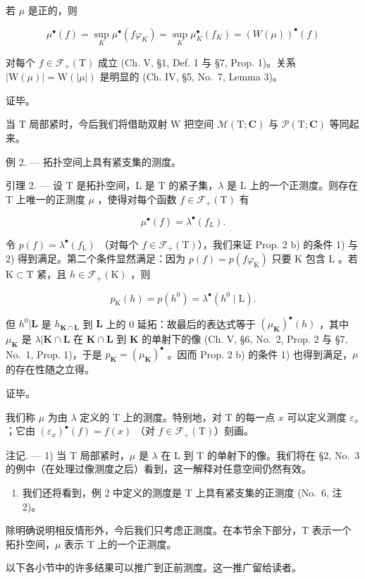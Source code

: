 若 \(\mu\) 是正的，则

\[
\mu^ {\bullet} (f) = \sup _ {K} \mu^ {\bullet} (f \varphi_ {K}) = \sup _ {K} \mu_ {K} ^ {\bullet} (f _ {K}) = (W (\mu)) ^ {\bullet} (f)
\]

对每个 \(f \in \mathcal{F}_{+}(\mathrm{T})\) 成立 (Ch. V, §1, Def. 1 与 §7, Prop. 1)。关系 \(|\mathrm{W}(\mu)| = \mathrm{W}(|\mu|)\) 是明显的 (Ch. IV, §5, No.~7, Lemma 3)。

证毕。

当 T 局部紧时，今后我们将借助双射 W 把空间 \(\mathcal{M}(\mathrm{T};\mathbf{C})\) 与 \(\mathcal{P}(\mathrm{T};\mathbf{C})\) 等同起来。

例 2. --- 拓扑空间上具有紧支集的测度。

引理 2. --- 设 T 是拓扑空间，L 是 T 的紧子集，\(\lambda\) 是 L 上的一个正测度。则存在 T 上唯一的正测度 \(\mu\) ，使得对每个函数 \(f \in \mathcal{F}_{+}(\mathrm{T})\) 有

\[
\mu^ {\bullet} (f) = \lambda^ {\bullet} (f _ {L}).\tag{2}
\]

令 \(p(f) = \lambda^{\bullet}(f_{\mathrm{L}})\) （对每个 \(f \in \mathcal{F}_{+}(\mathrm{T})\)），我们来证 Prop. 2 b) 的条件 1) 与 2) 得到满足。第二个条件显然满足：因为 \(p(f) = p(f\varphi_{\mathrm{K}})\) 只要 \(\mathrm{K}\) 包含 \(\mathrm{L}\) 。若 \(\mathrm{K} \subset \mathrm{T}\) 紧，且 \(h \in \mathcal{F}_{+}(\mathrm{K})\) ，则

\[
p _ {\mathrm{K}} (h) = p \left(h ^ {0}\right) = \lambda^ {\bullet} \left(h ^ {0} \mid \mathrm{L}\right).
\]

但 \(h^0 | \mathbf{L}\) 是 \(h_{\mathbf{K} \cap \mathbf{L}}\) 到 \(\mathbf{L}\) 上的 0 延拓：故最后的表达式等于 \((\mu_{\mathbf{K}})^{\bullet}(h)\) ，其中 \(\mu_{\mathbf{K}}\) 是 \(\lambda | \mathbf{K} \cap \mathbf{L}\) 在 \(\mathbf{K} \cap \mathbf{L}\) 到 \(\mathbf{K}\) 的单射下的像 (Ch. V, §6, No.~2, Prop. 2 与 §7, No.~1, Prop. 1)，于是 \(p_{\mathbf{K}} = (\mu_{\mathbf{K}})^{\bullet}\) 。因而 Prop. 2 b) 的条件 1) 也得到满足，\(\mu\) 的存在性随之立得。

证毕。

我们称 \(\mu\) 为由 \(\lambda\) 定义的 T 上的测度。特别地，对 T 的每一点 \(x\) 可以定义测度 \(\varepsilon_x\) ；它由 \((\varepsilon_x)^{\bullet}(f) = f(x)\) （对 \(f \in \mathcal{F}_{+}(\mathrm{T})\)）刻画。

注记. --- 1) 当 T 局部紧时，\(\mu\) 是 \(\lambda\) 在 L 到 T 的单射下的像。我们将在 §2, No.~3 的例中（在处理过像测度之后）看到，这一解释对任意空间仍然有效。

\begin{enumerate}
\def\labelenumi{\arabic{enumi})}
\setcounter{enumi}{1}
\tightlist
\item
  我们还将看到，例 2 中定义的测度是 T 上具有紧支集的正测度 (No.~6, 注 2)。
\end{enumerate}

除明确说明相反情形外，今后我们只考虑正测度。在本节余下部分，T 表示一个拓扑空间，\(\mu\) 表示 T 上的一个正测度。

以下各小节中的许多结果可以推广到正前测度。这一推广留给读者。


